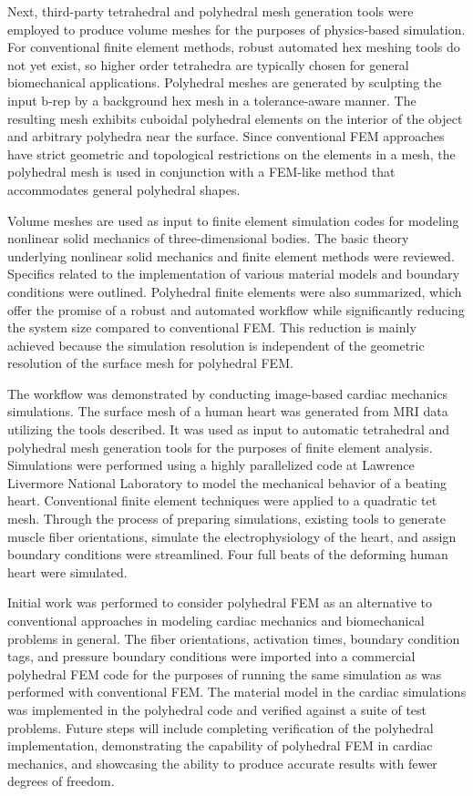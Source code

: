 Next, third-party tetrahedral and polyhedral mesh generation tools were employed to produce volume meshes for the purposes of physics-based simulation. For conventional finite element methods, robust automated hex meshing tools do not yet exist, so higher order tetrahedra are typically chosen for general biomechanical applications. Polyhedral meshes are generated by sculpting the input b-rep by a background hex mesh in a tolerance-aware manner. The resulting mesh exhibits cuboidal polyhedral elements on the interior of the object and arbitrary polyhedra near the surface. Since conventional FEM approaches have strict geometric and topological restrictions on the elements in a mesh, the polyhedral mesh is used in conjunction with a FEM-like method that accommodates general polyhedral shapes.

Volume meshes are used as input to finite element simulation codes for modeling nonlinear solid mechanics of three-dimensional bodies. The basic theory underlying nonlinear solid mechanics and finite element methods were reviewed. Specifics related to the implementation of various material models and boundary conditions were outlined. Polyhedral finite elements were also summarized, which offer the promise of a robust and automated workflow while significantly reducing the system size compared to conventional FEM. This reduction is mainly achieved because the simulation resolution is independent of the geometric resolution of the surface mesh for polyhedral FEM.

The workflow was demonstrated by conducting image-based cardiac mechanics simulations. The surface mesh of a human heart was generated from MRI data utilizing the tools described. It was used as input to automatic tetrahedral and polyhedral mesh generation tools for the purposes of finite element analysis. Simulations were performed using a highly parallelized code at Lawrence Livermore National Laboratory to model the mechanical behavior of a beating heart. Conventional finite element techniques were applied to a quadratic tet mesh. Through the process of preparing simulations, existing tools to generate muscle fiber orientations, simulate the electrophysiology of the heart, and assign boundary conditions were streamlined. Four full beats of the deforming human heart were simulated.

Initial work was performed to consider polyhedral FEM as an alternative to conventional approaches in modeling cardiac mechanics and biomechanical problems in general. The fiber orientations, activation times, boundary condition tags, and pressure boundary conditions were imported into a commercial polyhedral FEM code for the purposes of running the same simulation as was performed with conventional FEM. The material model in the cardiac simulations was implemented in the polyhedral code and verified against a suite of test problems. Future steps will include completing verification of the polyhedral implementation, demonstrating the capability of polyhedral FEM in cardiac mechanics, and showcasing the ability to produce accurate results with fewer degrees of freedom.

